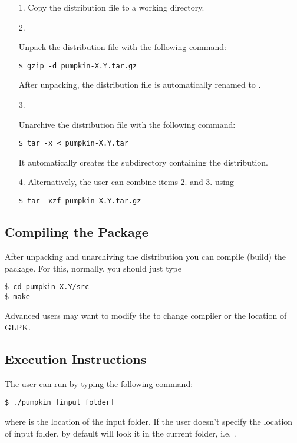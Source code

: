 \begin{enumerate}
  \item [1.] {Copy the \pump{} distribution file to a working directory.}
  \item [2.] {Unpack the distribution file with the following command:
\begin{display}
\begin{verbatim}
$ gzip -d pumpkin-X.Y.tar.gz
\end{verbatim}
\end{display}
After unpacking, the distribution file is automatically renamed to
   .
}
  \item [3.] {Unarchive the distribution file with the following command:
\begin{display}
\begin{verbatim}
$ tar -x < pumpkin-X.Y.tar
\end{verbatim}
\end{display}
 It automatically creates the subdirectory  containing the
   \pump{} distribution.}
 \item [4.]  {Alternatively, the user can combine items 2. and 3. using}
\begin{display}
\begin{verbatim}
$ tar -xzf pumpkin-X.Y.tar.gz
\end{verbatim}
\end{display}
\end{enumerate}


\subsection{Compiling the Package}
\label{sec_2_1_2}
After unpacking and unarchiving the \pump{} distribution you can compile (build) the package. For this, normally, you should just type
\begin{display}
\begin{verbatim}
$ cd pumpkin-X.Y/src
$ make
\end{verbatim}
\end{display}
Advanced users may want to modify the  to change compiler or the location of GLPK.


\subsection{Execution Instructions}
\label{sec_2_1_3}
The user can run \pump{} by typing the following command:
\begin{display}
\begin{verbatim}
$ ./pumpkin [input folder]
\end{verbatim}
\end{display}
where  is the location of the input folder. If the user doesn't specify the location of input folder, \pump{} by default will look it in the current folder, i.e. .

